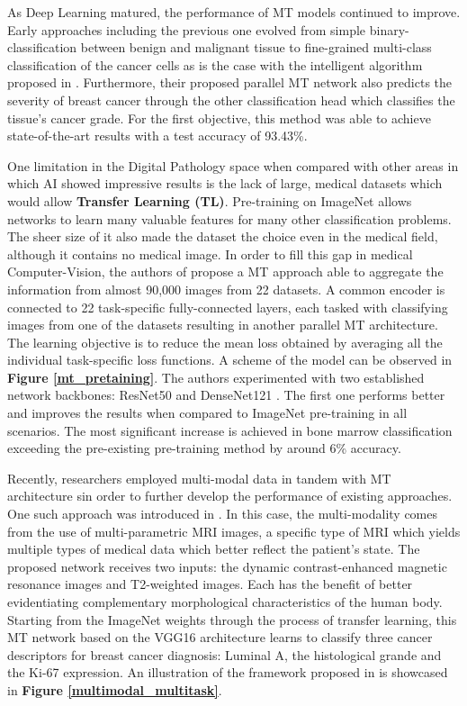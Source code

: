 \documentclass[conference]{IEEEtran}
\begin{document}
As Deep Learning matured, the performance of MT models continued to improve. Early approaches including the previous one evolved from simple binary-classification between benign and malignant tissue to fine-grained multi-class classification of the cancer cells as is the case with the intelligent algorithm proposed in \cite{li2020multi}. Furthermore, their proposed parallel MT network also predicts the severity of breast cancer through the other classification head which classifies the tissue's cancer grade. For the first objective, this method was able to achieve state-of-the-art results with a test accuracy of 93.43\%.

One limitation in the Digital Pathology space when compared with other areas in which AI showed impressive results is the lack of large, medical datasets which would allow \textbf{Transfer Learning (TL)}. Pre-training on ImageNet \cite{deng2009imagenet} allows networks to learn many valuable features for many other classification problems. The sheer size of it also made the dataset the choice even in the medical field, although it contains no medical image. In order to fill this gap in medical Computer-Vision, the authors of \cite{mormont2020multi} propose a MT approach able to aggregate the information from almost 90,000 images from 22 datasets. A common encoder is connected to 22 task-specific fully-connected layers, each tasked with classifying images from one of the datasets resulting in another parallel MT architecture. The learning objective is to reduce the mean loss obtained by averaging all the individual task-specific loss functions. A scheme of the model can be observed in \textbf{Figure \ref{mt_pretaining}}. The authors experimented with two established network backbones: ResNet50 \cite{he2016deep} and DenseNet121 \cite{huang2017densely}. The first one performs better and improves the results when compared to ImageNet pre-training in all scenarios. The most significant increase is achieved in bone marrow classification exceeding the pre-existing pre-training method by around 6\% accuracy.


Recently, researchers employed multi-modal data in tandem with MT architecture sin order to further develop the performance of existing approaches. One such approach was introduced in \cite{fan2022framework}. In this case, the multi-modality comes from the use of multi-parametric MRI images, a specific type of MRI which yields multiple types of medical data which better reflect the patient's state. The proposed network receives two inputs: the dynamic contrast-enhanced magnetic resonance images and T2-weighted images. Each has the benefit of better evidentiating complementary morphological characteristics of the human body. Starting from the ImageNet weights through the process of transfer learning, this MT network based on the VGG16 \cite{simonyan2014very} architecture learns to classify three cancer descriptors for breast cancer diagnosis: Luminal A, the histological grande and the Ki-67 expression. An illustration of the framework proposed in \cite{fan2022framework} is showcased in \textbf{Figure \ref{multimodal_multitask}}.
\end{document}

